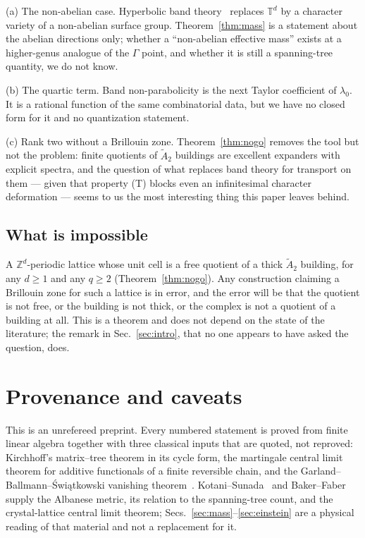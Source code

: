 \documentclass[aps,prb,reprint,amsmath,amssymb,floatfix,superscriptaddress]{revtex4-2}
\theoremstyle{plain}
\theoremstyle{definition}
\theoremstyle{remark}
\newcommand{\Z}{\mathbb{Z}}
\newcommand{\T}{\mathbb{T}}
\newcommand{\Atwo}{\widetilde A_2}
\begin{document}
(a) The non-abelian case. Hyperbolic band theory~\cite{MR1,MR2} replaces $\T^{d}$ by a
character variety of a non-abelian surface group. Theorem~\ref{thm:mass} is a statement
about the abelian directions only; whether a ``non-abelian effective mass'' exists at a
higher-genus analogue of the $\Gamma$ point, and whether it is still a spanning-tree
quantity, we do not know.

(b) The quartic term. Band non-parabolicity is the next Taylor coefficient of
$\lambda_0$. It is a rational function of the same combinatorial data, but we have no
closed form for it and no quantization statement.

(c) Rank two without a Brillouin zone. Theorem~\ref{thm:nogo} removes the tool but not the
problem: finite quotients of $\Atwo$ buildings are excellent expanders with explicit
spectra, and the question of what replaces band theory for transport on them --- given that
property (T) blocks even an infinitesimal character deformation --- seems to us the most
interesting thing this paper leaves behind.

\subsection{What is impossible}

A $\Z^{d}$-periodic lattice whose unit cell is a free quotient of a thick $\Atwo$ building,
for any $d\ge1$ and any $q\ge2$ (Theorem~\ref{thm:nogo}). Any construction claiming a
Brillouin zone for such a lattice is in error, and the error will be that the quotient is
not free, or the building is not thick, or the complex is not a quotient of a building at
all. This is a theorem and does not depend on the state of the literature; the remark in
Sec.~\ref{sec:intro}, that no one appears to have asked the question, does.

\section*{Provenance and caveats}

This is an unrefereed preprint. Every numbered statement is proved from finite linear
algebra together with three classical inputs that are quoted, not reproved: Kirchhoff's
matrix--tree theorem in its cycle form, the martingale central limit theorem for additive
functionals of a finite reversible chain, and the Garland--Ballmann--\'Swi\k{a}tkowski
vanishing theorem~\cite{Ga,BSw}. Kotani--Sunada~\cite{KS1,KS2,KS3} and Baker--Faber~\cite{BF}
supply the Albanese metric, its relation to the spanning-tree count, and the
crystal-lattice central limit theorem; Secs.~\ref{sec:mass}--\ref{sec:einstein} are a
physical reading of that material and not a replacement for it.
\end{document}
